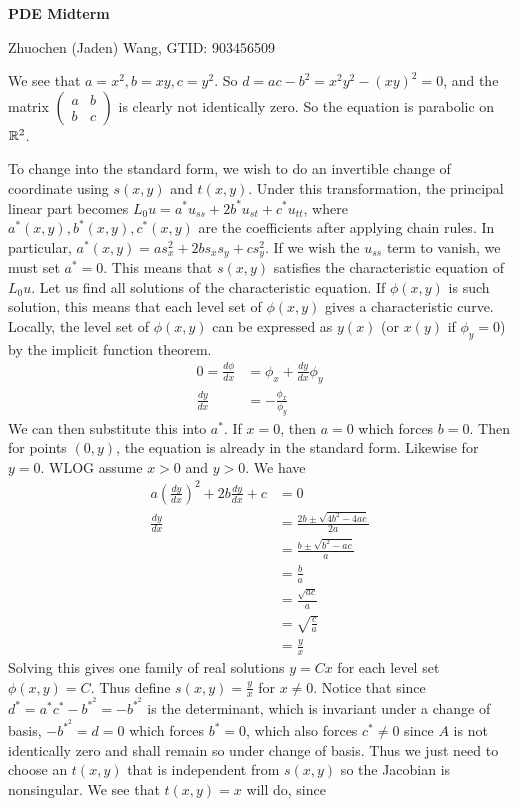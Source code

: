 \documentclass[12pt]{article}
\begin{document}
\centerline {\textsf{\textbf{\LARGE{PDE Midterm}}}}
\centerline {Zhuochen (Jaden) Wang, GTID: 903456509}
\vspace{.15in}
\begin{problem}[1]
	We see that $ a = x^2, b = xy, c = y^2$. So $ d = ac - b^2 = x^2 y^2 - (xy)^2 = 0 $, and the matrix $ \begin{pmatrix} a&b\\b&c \end{pmatrix} $ is clearly not identically zero. So the equation is parabolic on $ \mathbb{R}^2$.

	To change into the standard form, we wish to do an invertible change of coordinate using $ s(x,y)$ and  $ t(x,y)$. Under this transformation, the principal linear part becomes  $ L_0 u = a^* u_{ss} +2b^* u_{st} + c^* u_{tt}$, where $ a^*(x,y) ,b^*(x,y) ,c^*(x,y) $ are the coefficients after applying chain rules. In particular, $ a^*(x,y) = a s_{x}^2 + 2b s_{x}s_y + cs_{y}^2 $. If we wish the $ u_{ss}$ term to vanish, we must set $ a^* =0$. This means that $ s(x,y)$ satisfies the characteristic equation of $ L_0 u$. Let us find all solutions of the characteristic equation. If $ \phi(x,y)$ is such solution, this means that each level set of $ \phi(x,y)$ gives a characteristic curve. Locally, the level set of $ \phi(x,y)$ can be expressed as $y(x) $ (or $ x(y)$ if $ \phi_y=0$) by the implicit function theorem. 
 \begin{align*}
	0=\frac{d\phi}{ dx} &= \phi_x + \frac{d y}{d x} \phi_y  \\
	\frac{d y}{d x} &= - \frac{\phi_x}{ \phi_y} 
\end{align*}
We can then substitute this into $ a^* $. If $ x=0$, then  $ a=0$ which forces $ b=0$. Then for points $ (0,y)$, the equation is already in the standard form. Likewise for $ y=0$. WLOG assume $ x>0$ and $ y>0$. We have
\begin{align*}
	a \left( \frac{d y}{d x}  \right) ^2 + 2b \frac{d y}{d x} + c &= 0 \\
	\frac{d y}{d x} &= \frac{ 2b \pm \sqrt{4b^2-4ac} }{ 2a}  \\
	&= \frac{b\pm \sqrt{b^2-ac} }{ a} \\
	&= \frac{b}{a} \\
	&= \frac{\sqrt{ac} }{ a}  \\
	&= \sqrt{\frac{c}{a}} \\
	&= \frac{y}{ x} 
\end{align*}
	Solving this gives one family of real solutions $ y = C x$ for each level set $ \phi(x,y) = C$. Thus define $ s(x,y) = \frac{y}{x}$ for $ x \neq 0$. Notice that since $ d^* = a^* c^*  - b^* ^2 = -b^* ^2$ is the determinant, which is invariant under a change of basis, $ -b^* ^2 = d = 0$ which forces $ b^* =0$, which also forces $ c^* \neq 0$ since $ A$ is not identically zero and shall remain so under change of basis. Thus we just need to choose an $ t(x,y)$ that is independent from $ s(x,y)$ so the Jacobian is nonsingular. We see that $ t(x,y) = x$ will do, since

\end{problem}
\end{document}
